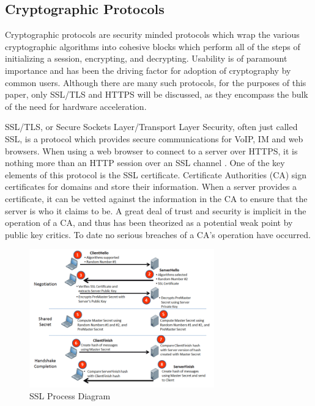 \documentclass[journal]{IEEEtran}
\begin{document}
\subsection{Cryptographic Protocols}

Cryptographic protocols are security minded protocols which wrap the various cryptographic algorithms into cohesive blocks which perform all of the steps of initializing a session, encrypting, and decrypting.  Usability is of paramount importance and has been the driving factor for adoption of cryptography by common users.  Although there are many such protocols, for the purposes of this paper, only SSL/TLS and HTTPS will be discussed, as they encompass the bulk of the need for hardware acceleration.

SSL/TLS, or Secure Sockets Layer/Transport Layer Security, often just called SSL, is a protocol which provides secure communications for VoIP, IM and web browsers.  When using a web browser to connect to a server over HTTPS, it is nothing more than an HTTP session over an SSL channel \cite{howSSLWorks}.  One of the key elements of this protocol is the SSL certificate.  Certificate Authorities (CA) sign certificates for domains and store their information.  When a server provides a certificate, it can be vetted against the information in the CA to ensure that the server is who it claims to be.  A great deal of trust and security is implicit in the operation of a CA, and thus has been theorized as a potential weak point by public key critics.  To date no serious breaches of a CA's operation have occurred.

\begin{figure}[htbp]
	\centering
	\includegraphics[width=8cm,keepaspectratio]{img/sslDiagram.png}
	\caption{SSL Process Diagram \cite{sslImage} }
	\label{sslFigure}
\end{figure}
\end{document}
